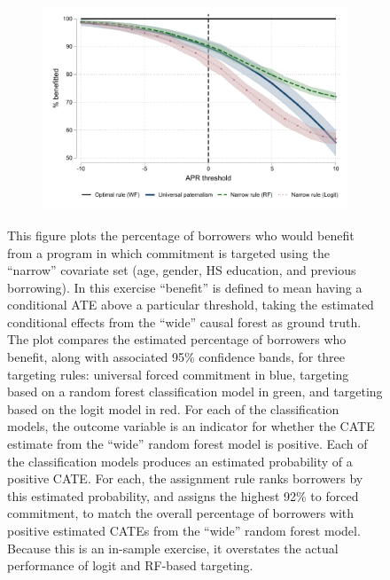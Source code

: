 \documentclass[oneside,11pt]{article}
\begin{document}
\begin{figure}[H]
    \caption{Targeting rules}
    \label{targeting_rules}
    \begin{center}
    \begin{subfigure}{0.75\textwidth}
        \centering
        \includegraphics[width=\textwidth]{Figuras/wide_narrow_rule.pdf}
    \end{subfigure}
    \end{center}
      \scriptsize   This figure plots the percentage of borrowers who would benefit from a program in which commitment is targeted using the ``narrow'' covariate set (age, gender, HS education, and previous borrowing). In this exercise ``benefit'' is defined to mean having a conditional ATE above a particular threshold, taking the estimated conditional effects from the ``wide'' causal forest as ground truth. The plot compares the estimated percentage of borrowers who benefit, along with associated 95\% confidence bands, for three targeting rules: universal forced commitment in blue, targeting based on a random forest classification model in green, and targeting based on the logit model in red. For each of the classification models, the outcome variable is an indicator for whether the CATE estimate from the ``wide'' random forest model is positive. Each of the classification models produces an estimated probability of a positive CATE. For each, the assignment rule ranks borrowers by this estimated probability, and assigns the highest 92\% to forced commitment, to match the overall percentage of borrowers with positive estimated CATEs from the ``wide'' random forest model. Because this is an in-sample exercise, it overstates the actual performance of logit and RF-based targeting. 


\end{figure}
\end{document}
